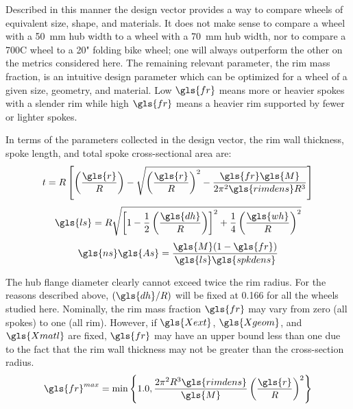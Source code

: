 \documentclass[\rootdir/thesis.tex]{subfiles}
\begin{document}
Described in this manner the design vector provides a way to compare wheels of equivalent size, shape, and materials. It does not make sense to compare a wheel with a \SI{50}{mm} hub width to a wheel with a \SI{70}{mm} hub width, nor to compare a 700C wheel to a 20" folding bike wheel; one will always outperform the other on the metrics considered here. The remaining relevant parameter, the rim mass fraction, is an intuitive design parameter which can be optimized for a wheel of a given size, geometry, and material. Low $\gls{fr}$ means more or heavier spokes with a slender rim while high $\gls{fr}$ means a heavier rim supported by fewer or lighter spokes.


In terms of the parameters collected in the design vector, the rim wall thickness, spoke length, and total spoke cross-sectional area are:
\begin{equation}
\label{eqn:design:t}
t = R\left[ \left(\frac{\gls{r}}{R}\right) - \sqrt{\left(\frac{\gls{r}}{R}\right)^2 - \frac{\gls{fr}\gls{M}}{2\pi^2\gls{rimdens}R^3}}\right]
\end{equation}
\begin{equation}
\label{eqn:design:ls}
\gls{ls} = R\sqrt{\left[1-\frac{1}{2}\left(\frac{\gls{dh}}{R}\right)\right]^2 + \frac{1}{4}\left(\frac{\gls{wh}}{R}\right)^2}
\end{equation}
\begin{equation}
\label{eqn:design:nsAs}
\gls{ns}\gls{As} = \frac{\gls{M}(1-\gls{fr})}{\gls{ls}\gls{spkdens}}
\end{equation}

The hub flange diameter clearly cannot exceed twice the rim radius. For the reasons described above, $(\gls{dh}/R)$ will be fixed at 0.166 for all the wheels studied here. Nominally, the rim mass fraction $\gls{fr}$ may vary from zero (all spokes) to one (all rim). However, if $\gls{Xext}$, $\gls{Xgeom}$, and $\gls{Xmatl}$ are fixed, $\gls{fr}$ may have an upper bound less than one due to the fact that the rim wall thickness may not be greater than the cross-section radius.
\begin{equation}
\label{eqn:frim_max}
\gls{fr}^{max} = \min\left\lbrace 1.0, \frac{2\pi^2 R^3\gls{rimdens}}{\gls{M}}\left(\frac{\gls{r}}{R}\right)^2 \right\rbrace
\end{equation}
\end{document}
